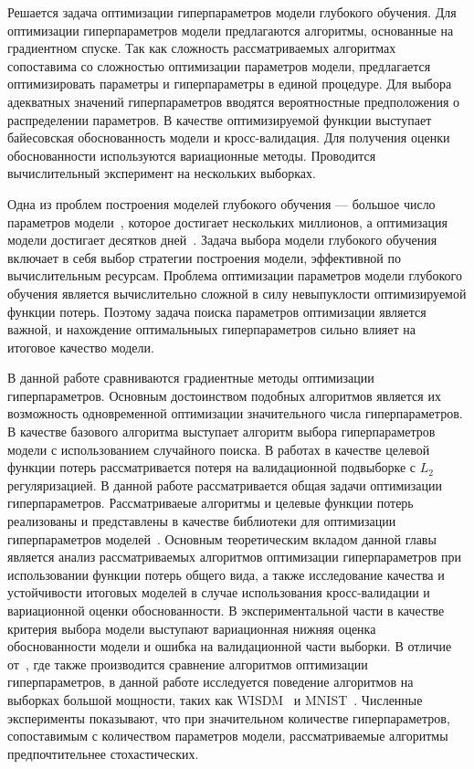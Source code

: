 Решается задача оптимизации гиперпараметров модели глубокого обучения. Для оптимизации гиперпараметров модели предлагаются алгоритмы, основанные на градиентном спуске. Так как сложность рассматриваемых алгоритмах сопоставима со сложностью оптимизации параметров модели, предлагается оптимизировать параметры и гиперпараметры в единой процедуре. Для выбора адекватных значений гиперпараметров вводятся вероятностные предположения о распределении параметров. В качестве оптимизируемой функции выступает байесовская обоснованность модели и кросс-валидация. Для получения оценки обоснованности используются вариационные методы. Проводится вычислительный эксперимент на нескольких выборках.

Одна из проблем построения моделей глубокого обучения --- большое число параметров модели~\cite{hinton_rbm}, которое достигает нескольких миллионов, а оптимизация модели достигает десятков дней~\cite{suts}. Задача выбора модели глубокого обучения включает в себя выбор стратегии построения модели, эффективной по вычислительным ресурсам. Проблема оптимизации параметров модели глубокого обучения является вычислительно сложной в силу невыпуклости оптимизируемой функции потерь. Поэтому задача поиска параметров оптимизации является важной, и нахождение оптимальныых гиперпараметров сильно влияет на итоговое качество модели. 

В данной работе сравниваются градиентные методы оптимизации гиперпараметров. Основным достоинством подобных алгоритмов является их возможность одновременной оптимизации значительного числа гиперпараметров. В качестве базового алгоритма выступает алгоритм выбора гиперпараметров модели с использованием случайного поиска.  В работах\cite{hyper_mad,hyper_hoag,greed_hyper} в качестве целевой функции потерь рассматривается потеря на валидационной подвыборке с $L_2$ регуляризацией. В данной работе рассматривается общая задачи оптимизации гиперпараметров. Рассматриваеые алгоритмы и целевые функции потерь реализованы и представлены в качестве библиотеки для оптимизации гиперпараметров моделей~\cite{pyfos}. Основным теоретическим вкладом данной главы является анализ рассматриваемых алгоритмов оптимизации гиперпараметров при использовании функции потерь общего вида, а также исследование качества и устойчивости итоговых моделей в случае использования кросс-валидации и вариационной оценки обоснованности.  В экспериментальной части в качестве критерия выбора модели выступают вариационная нижняя оценка обоснованности модели и ошибка на валидационной части выборки. В отличие от~\cite{hyper_hoag}, где также производится сравнение алгоритмов оптимизации гиперпараметров, в данной работе исследуется поведение алгоритмов на выборках большой мощности, таких как WISDM~\cite{wisdm} и MNIST~\cite{mnist}.
Численные эксперименты показывают, что при значительном количестве гиперпараметров, сопоставимым с количеством параметров модели, рассматриваемые алгоритмы предпочтительнее стохастических. 




